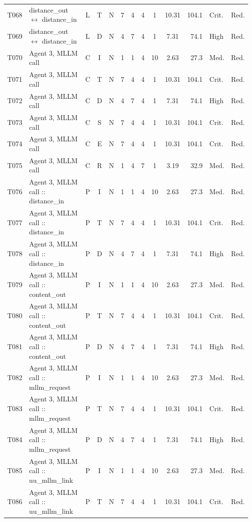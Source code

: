 \documentclass[9pt]{extarticle}
\begin{document}
\begin{longtable}{l>{\raggedright\arraybackslash}p{6.3cm}ccccccccrll}
T068 & distance\_out $\leftrightarrow$ distance\_in & L & T & N & 7 & 4 & 4 & 1 & 10.31 & 104.1 & Crit. & Red. \\
T069 & distance\_out $\leftrightarrow$ distance\_in & L & D & N & 4 & 7 & 4 & 1 & 7.31 & 74.1 & High & Red. \\
T070 & Agent 3, MLLM call & C & I & N & 1 & 1 & 4 & 10 & 2.63 & 27.3 & Med. & Red. \\
T071 & Agent 3, MLLM call & C & T & N & 7 & 4 & 4 & 1 & 10.31 & 104.1 & Crit. & Red. \\
T072 & Agent 3, MLLM call & C & D & N & 4 & 7 & 4 & 1 & 7.31 & 74.1 & High & Red. \\
T073 & Agent 3, MLLM call & C & S & N & 7 & 4 & 4 & 1 & 10.31 & 104.1 & Crit. & Red. \\
T074 & Agent 3, MLLM call & C & E & N & 7 & 4 & 4 & 1 & 10.31 & 104.1 & Crit. & Red. \\
T075 & Agent 3, MLLM call & C & R & N & 1 & 4 & 7 & 1 & 3.19 & 32.9 & Med. & Red. \\
T076 & Agent 3, MLLM call :: distance\_in & P & I & N & 1 & 1 & 4 & 10 & 2.63 & 27.3 & Med. & Red. \\
T077 & Agent 3, MLLM call :: distance\_in & P & T & N & 7 & 4 & 4 & 1 & 10.31 & 104.1 & Crit. & Red. \\
T078 & Agent 3, MLLM call :: distance\_in & P & D & N & 4 & 7 & 4 & 1 & 7.31 & 74.1 & High & Red. \\
T079 & Agent 3, MLLM call :: content\_out & P & I & N & 1 & 1 & 4 & 10 & 2.63 & 27.3 & Med. & Red. \\
T080 & Agent 3, MLLM call :: content\_out & P & T & N & 7 & 4 & 4 & 1 & 10.31 & 104.1 & Crit. & Red. \\
T081 & Agent 3, MLLM call :: content\_out & P & D & N & 4 & 7 & 4 & 1 & 7.31 & 74.1 & High & Red. \\
T082 & Agent 3, MLLM call :: mllm\_request & P & I & N & 1 & 1 & 4 & 10 & 2.63 & 27.3 & Med. & Red. \\
T083 & Agent 3, MLLM call :: mllm\_request & P & T & N & 7 & 4 & 4 & 1 & 10.31 & 104.1 & Crit. & Red. \\
T084 & Agent 3, MLLM call :: mllm\_request & P & D & N & 4 & 7 & 4 & 1 & 7.31 & 74.1 & High & Red. \\
T085 & Agent 3, MLLM call :: uu\_mllm\_link & P & I & N & 1 & 1 & 4 & 10 & 2.63 & 27.3 & Med. & Red. \\
T086 & Agent 3, MLLM call :: uu\_mllm\_link & P & T & N & 7 & 4 & 4 & 1 & 10.31 & 104.1 & Crit. & Red. \\

\end{longtable}
\end{document}
